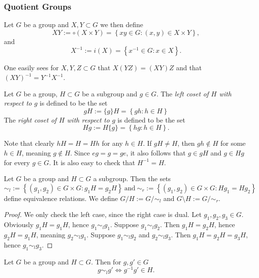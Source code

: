 \subsubsection{Quotient Groups}
\begin{definition}
    Let $G$ be a group and $X,Y\subset G$ we then define 
    $$XY := \circ (X\times Y) = \left\{xy \in G : (x,y)\in X\times Y \right\},$$
    and 
    $$X^{-1} := i(X) = \left\{ x^{-1} \in G : x \in X \right\}.$$
\end{definition}
\begin{remark}\label{AssociativityOfMultiplicationSets}
    One easily sees for $X,Y,Z\subset G$ that $X(YZ) = (XY)Z$ and that $(XY)^{-1} = Y^{-1}X^{-1}$.
\end{remark}
\begin{definition}
    Let $G$ be a group, $H\subset G$ be a subgroup and $g\in G$. The \textit{left coset of $H$ with respect to $g$} is defined to be the set 
    $$gH := \{g\}H =  \left\{ gh : h\in H \right\}$$
    The \textit{right coset of $H$ with respect to $g$} is defined to be the set
    $$Hg := H\{g\} =  \left\{ hg : h\in H\right\}.$$
\end{definition}
\begin{remark}\label{StabOfSubgroupIsSubgroup}
    Note that clearly $hH = H = Hh$ for any $h\in H$. If $gH \neq H$, then $gh \notin H$ for some $h\in H$, meaning $g \notin H$. Since $eg = g = ge$, it also follows that $g\in gH$ and $g\in Hg$ for every $g\in G$. It is also easy to check that $H^{-1}=H$.
\end{remark}
\begin{proposition}
    Let $G$ be a group and $H\subset G$ a subgroup. Then the sets 
    $$\sim_l := \left\{ (g_1,g_2)\in G\times G : g_1H = g_2H \right\} \ \text{and} \ \sim_r := \left\{ (g_1,g_2)\in G\times G : Hg_1 = Hg_2 \right\}$$
    define equivalence relations. We define $G/H := G/\sim_l$ and $G\setminus H := G/\sim_r$.
\end{proposition}
\begin{proof}
    We only check the left case, since the right case is dual. Let $g_1,g_2,g_3\in G$. Obviously $g_1H = g_1H$, hence $g_1\sim_l g_1$. Suppose $g_1\sim_l g_2$. Then $g_1H = g_2H$, hence $g_2H=g_1H$, meaning $g_2\sim_l g_1$. Suppose $g_1\sim_l g_2$ and $g_2\sim_l g_3$. Then $g_1H = g_2H = g_3H$, hence $g_1\sim_l g_3$. 
\end{proof}
\begin{lemma}
    Let $G$ be a group and $H\subset G$. Then for $g,g'\in G$
    $$g\sim_l g' \iff g^{-1}g'\in H.$$
\end{lemma}
